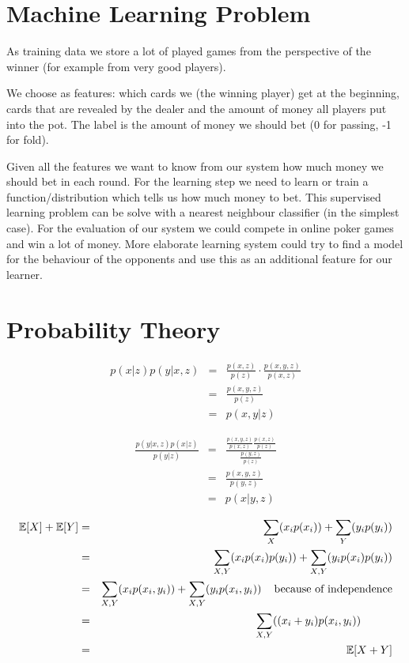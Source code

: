 \section*{Machine Learning Problem}
As training data we store a lot of played games from the perspective of the winner (for example from very good players). 

We choose as features: which cards we (the winning player) get at the beginning, cards that are revealed by the dealer and the amount of money all players put into the pot. The label is the amount of money we should bet (0 for passing, -1 for fold).

Given all the features we want to know from our system how much money we should bet in each round. For the learning step we need to learn or train a function/distribution which tells us how much money to bet. This supervised learning problem can be solve with a nearest neighbour classifier (in the simplest case). For the evaluation of our system we could compete in online poker games and win a lot of money. More elaborate learning system could try to find a model for the behaviour of the opponents and use this as an additional feature for our learner. 



\section*{Probability Theory}

\begin{eqnarray} 
    p(x|z)p(y|x,z) &=&  \frac{p(x,z)}{p(z)}\cdot \frac{p(x,y,z)}{p(x,z)} \\
    &=&  \frac{p(x,y,z)}{p(z)} \\
    &=&  p(x,y|z) 
\end{eqnarray}

\begin{eqnarray}
    \frac{p(y| x,z)p(x|z)}{p(y|z)}&=& \frac{\frac{p(x,y,z)}{p(x,z)} \frac{p(x,z)}{p(z)}}{\frac{p(y,z)}{p(z)}} \\
    &=& \frac{p(x,y,z)}{p(y,z)} \\
    &=& p(x|y,z) 
\end{eqnarray}


\begin{eqnarray}
    \mathbb{E}[X]+\mathbb{E}[Y]&=& \sum_{X}(x_i p(x_i)) + \sum_{Y}(y_i p(y_i))\\
    &=& \sum_{X, Y}(x_i p(x_i)p(y_i)) + \sum_{X,Y}(y_i p(x_i)p(y_i))\\
    &=& \sum_{X, Y}(x_i p(x_i,y_i)) + \sum_{X,Y}(y_i p(x_i,y_i)) \hspace{4mm}\mbox{because of independence}\\
    &=& \sum_{X, Y}((x_i+y_i) p(x_i,y_i))\hspace{1cm}\\
    &=& \mathbb{E}[X+Y]
\end{eqnarray}

